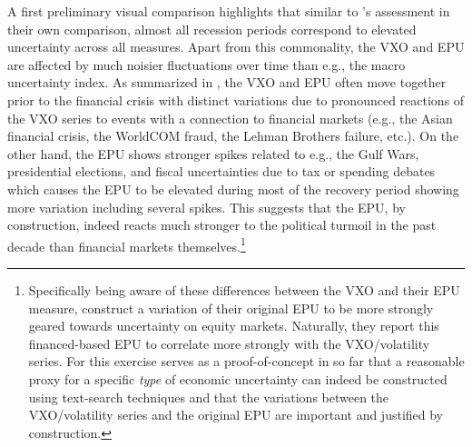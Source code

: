 \documentclass[a4paper,11pt,listof=nochaptergap,oneside,pointednumbers,bibtotoc,bigheadings,liststotoc,hidelinks]{scrbook}
\theoremstyle{mysatz}
\theoremstyle{mydefinition}
\theoremstyle{mytheorem}
\theoremstyle{mybemerkung}
\begin{document}
A first preliminary visual comparison highlights that similar to \citet{bachmannetal:13}'s assessment in their own comparison, almost all recession periods correspond to elevated uncertainty across all measures. Apart from this commonality, the VXO and EPU are affected by much noisier fluctuations over time than e.g., the macro uncertainty index. As summarized in \citet{bakeretal:15}, the VXO and EPU often move together prior to the financial crisis with distinct variations due to pronounced reactions of the VXO series to events with a connection to financial markets (e.g., the Asian financial crisis, the WorldCOM fraud, the Lehman Brothers failure, etc.). On the other hand, the EPU shows stronger spikes related to e.g., the Gulf Wars, presidential elections, and fiscal uncertainties due to tax or spending debates which causes the EPU to be elevated during most of the recovery period showing more variation including several spikes. This suggests that the EPU, by construction, indeed reacts much stronger to the political turmoil in the past decade than financial markets themselves.\footnote{Specifically being aware of these differences between the VXO and their EPU measure, \citet{bakeretal:15} construct a variation of their original EPU to be more strongly geared towards uncertainty on equity markets. Naturally, they report this financed-based EPU to correlate more strongly with the VXO/volatility series. For \citet{bakeretal:15} this exercise serves as a proof-of-concept in so far that a reasonable proxy for a specific \textit{type} of economic uncertainty can indeed be constructed using text-search techniques and that the variations between the VXO/volatility series and the original EPU are important and justified by construction.} 
\end{document}
